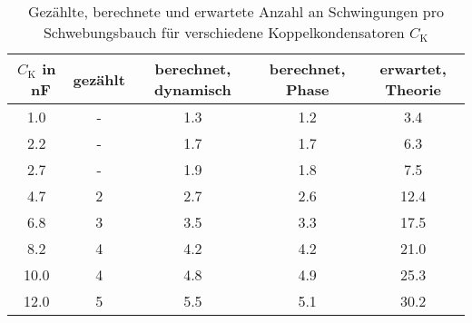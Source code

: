 \begin{table}[h!]
\begin{center}
\begin{tabular}{c | c | c | c | c}
	$C_\text{K}$ in \SI{}{\nano\farad} & gezählt & berechnet, dynamisch & berechnet, Phase & erwartet, Theorie \\
\hline
	1.0 & - & 1.3 & 1.2 & 3.4 \\
	2.2 & - & 1.7 & 1.7 & 6.3 \\
	2.7 & - & 1.9 & 1.8 & 7.5 \\
	4.7 & 2 & 2.7 & 2.6 & 12.4 \\
	6.8 & 3 & 3.5 & 3.3 & 17.5 \\
	8.2 & 4 & 4.2 & 4.2 & 21.0 \\
	10.0 & 4 & 4.8 & 4.9 & 25.3 \\
	12.0 & 5 & 5.5 & 5.1 & 30.2 \\
\end{tabular}
\end{center}
\caption{Gezählte, berechnete und erwartete Anzahl an Schwingungen pro Schwebungsbauch für verschiedene Koppelkondensatoren $C_\text{K}$}
\label{fig:Bauch}
\end{table}
